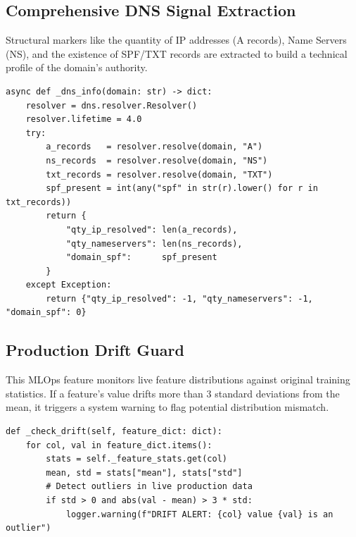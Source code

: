 \subsection{Comprehensive DNS Signal Extraction}
\noindent
Structural markers like the quantity of IP addresses (A records), Name Servers (NS), and the existence of SPF/TXT records are extracted to build a technical profile of the domain's authority.

\begin{listing}[htbp]
\begin{verbatim}
async def _dns_info(domain: str) -> dict:
    resolver = dns.resolver.Resolver()
    resolver.lifetime = 4.0
    try:
        a_records   = resolver.resolve(domain, "A")
        ns_records  = resolver.resolve(domain, "NS")
        txt_records = resolver.resolve(domain, "TXT")
        spf_present = int(any("spf" in str(r).lower() for r in txt_records))
        return {
            "qty_ip_resolved": len(a_records),
            "qty_nameservers": len(ns_records),
            "domain_spf":      spf_present
        }
    except Exception:
        return {"qty_ip_resolved": -1, "qty_nameservers": -1, "domain_spf": 0}
\end{verbatim}
\caption{DNS Structural Signal Extraction Pipeline (deep\_feature\_extractor.py)}
\label{lst:dns_extraction}
\end{listing}


\subsection{Production Drift Guard}
\noindent
This MLOps feature monitors live feature distributions against original training statistics. If a feature's value drifts more than 3 standard deviations from the mean, it triggers a system warning to flag potential distribution mismatch.

\begin{listing}[htbp]
\begin{verbatim}
def _check_drift(self, feature_dict: dict):
    for col, val in feature_dict.items():
        stats = self._feature_stats.get(col)
        mean, std = stats["mean"], stats["std"]
        # Detect outliers in live production data
        if std > 0 and abs(val - mean) > 3 * std:
            logger.warning(f"DRIFT ALERT: {col} value {val} is an outlier")
\end{verbatim}
\caption{Statistical Feature Drift Guard (xgb\_service.py)}
\label{lst:drift_guard}
\end{listing}

